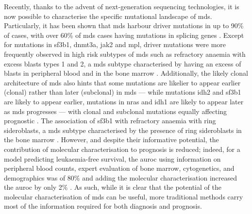 Recently, thanks to the advent of next-generation sequencing technologies, it is now possible to characterise the specific mutational landscape of \ac{mds}. Particularly, it has been shown that \ac{mds} harbour driver mutations in up to 90\% of cases, with over 60\% of \ac{mds} cases having mutations in splicing genes \cite{Papaemmanuil2013-yt,Haferlach2014-bh}. Except for mutations in \ac{sf3b1}, \ac{dnmt3a}, \ac{jak2} and \ac{mpl}, driver mutations were more frequently observed in high risk subtypes of \ac{mds} such as refractory anaemia with excess blasts types 1 and 2, a \ac{mds} subtype characterised by having an excess of blasts in peripheral blood and in the bone marrow \cite{Haferlach2014-bh}. Additionally, the likely clonal architecture of \ac{mds} also hints that some mutations are likelier to appear earlier (clonal) rather than later (subclonal) in \ac{mds} --- while mutations \ac{idh2} and \ac{sf3b1} are likely to appear earlier, mutations in \ac{nras} and \ac{idh1} are likely to appear later as \ac{mds} progresses --- with clonal and subclonal mutations equally affecting prognostic \cite{Papaemmanuil2013-yt}. The association of \ac{sf3b1} with refractory anaemia with ring sideroblasts, a \ac{mds} subtype characterised by the presence of ring sideroblasts in the bone marrow \cite{Papaemmanuil2011-nr, Papaemmanuil2013-yt, Haferlach2014-bh}. However, and despite their informative potential, the contribution of molecular characterisation to prognosis is reduced; indeed, for a model predicting leukaemia-free survival, the \ac{auroc} using information on peripheral blood counts, expert evaluation of bone marrow, cytogenetics, and demographics was of 80\% and adding the molecular characterisation increased the \ac{auroc} by only 2\% \cite{Papaemmanuil2013-yt}. As such, while it is clear that the potential of the molecular characterisation of \ac{mds} can be useful, more traditional methods carry most of the information required for both diagnosis and prognosis.

